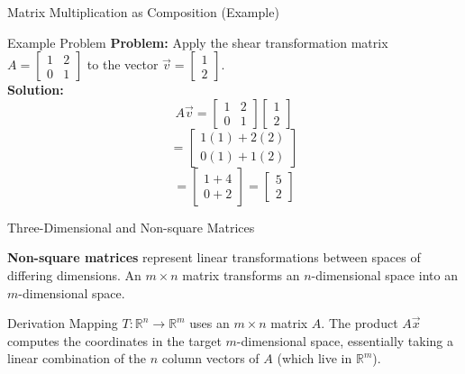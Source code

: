 \documentclass[10pt, aspectratio=169]{beamer}
\begin{document}
\begin{frame}{Matrix Multiplication as Composition (Example)}
    \begin{exampleblock}{Example Problem}
        \textbf{Problem:} Apply the shear transformation matrix $A = \begin{bmatrix} 1 & 2 \\ 0 & 1 \end{bmatrix}$ to the vector $\vec{v} = \begin{bmatrix} 1 \\ 2 \end{bmatrix}$. \\
        \vspace{0.5cm}
        \textbf{Solution:}
        $$A\vec{v} = \begin{bmatrix} 1 & 2 \\ 0 & 1 \end{bmatrix} \begin{bmatrix} 1 \\ 2 \end{bmatrix}$$
        $$= \begin{bmatrix} 1(1) + 2(2) \\ 0(1) + 1(2) \end{bmatrix}$$
        $$= \begin{bmatrix} 1 + 4 \\ 0 + 2 \end{bmatrix} = \begin{bmatrix} 5 \\ 2 \end{bmatrix}$$
    \end{exampleblock}
\end{frame}

\begin{frame}{Three-Dimensional and Non-square Matrices}
    \begin{definition}
        \textbf{Non-square matrices} represent linear transformations between spaces of differing dimensions. An $m \times n$ matrix transforms an $n$-dimensional space into an $m$-dimensional space.
    \end{definition}
    
    \begin{block}{Derivation}
        Mapping $T: \mathbb{R}^n \rightarrow \mathbb{R}^m$ uses an $m \times n$ matrix $A$. The product $A\vec{x}$ computes the coordinates in the target $m$-dimensional space, essentially taking a linear combination of the $n$ column vectors of $A$ (which live in $\mathbb{R}^m$).
    \end{block}
\end{frame}
\end{document}
